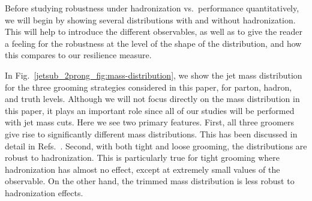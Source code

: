 \documentclass[11pt]{cernrep}
\begin{document}
Before studying robustness under hadronization vs.\ performance quantitatively, we will begin by showing several distributions with and without hadronization.
%
This will help to introduce the different observables, as well as to give the reader a feeling for the robustness at the level of the shape of the distribution, and how this compares to our resilience measure. 

In Fig.~\ref{jetsub_2prong_fig:mass-distribution}, we show the jet mass distribution for the three grooming strategies considered in this paper, for parton, hadron, and truth levels.
%
Although we will not focus directly on the mass distribution in this paper, it plays an important role since all of our studies will be performed with jet mass cuts.
%
Here we see two primary features.
%
First, all three groomers give rise to significantly different mass distributions.
%
This has been discussed in detail in Refs.~\cite{Dasgupta:2013ihk,Larkoski:2014wba}.
%
Second, with both tight and loose grooming, the distributions are robust to hadronization.
%
This is particularly true for tight grooming where hadronization has almost no effect, except at extremely small values of the observable.
%
On the other hand, the trimmed mass distribution is less robust to hadronization effects. 
\end{document}
